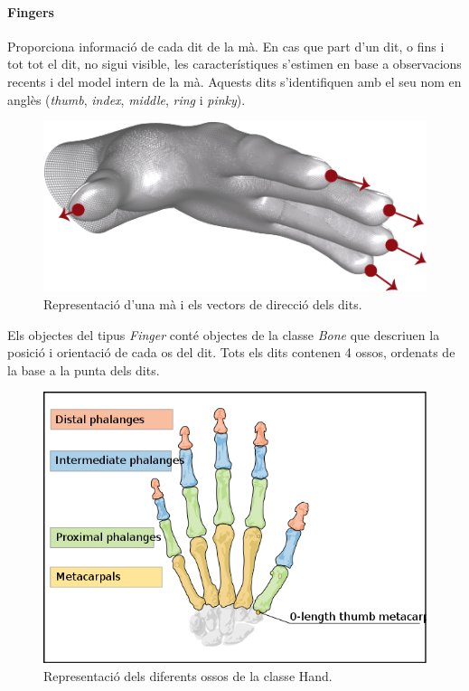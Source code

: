 \documentclass[12pt,a4paper,catalan]{article}
\begin{document}
	\paragraph{Fingers}
	Proporciona informació de cada dit de la mà. En cas que part d'un dit, o fins i tot tot el dit, no sigui visible, les característiques s'estimen en base a observacions recents i del model intern de la mà. Aquests dits s'identifiquen amb el seu nom en anglès (\textit{thumb}, \textit{index}, \textit{middle}, \textit{ring} i \textit{pinky}).
	\begin{figure}[H]
		\includegraphics[width=\textwidth,keepaspectratio]{leap-fingers-model.png}
		\centering
		\caption{Representació d'una mà i els vectors de direcció dels dits.}
		\label{fig:leap-hand-fingers}
	\end{figure}
	Els objectes del tipus \textit{Finger} conté objectes de la classe \textit{Bone} que descriuen la posició i orientació de cada os del dit. Tots els dits contenen 4 ossos, ordenats de la base a la punta dels dits.
	\begin{figure}[H]
		\includegraphics[width=\textwidth,keepaspectratio]{hand-bones.png}
		\centering
		\caption{Representació dels diferents ossos de la classe Hand.}
		\label{fig:hand-bones}
	\end{figure}
\end{document}

